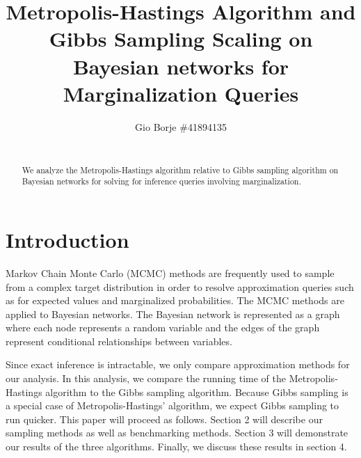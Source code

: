 \documentclass{sig-alternate}
\begin{document}
\title{Metropolis-Hastings Algorithm and Gibbs Sampling Scaling on
Bayesian networks for Marginalization Queries}
\author{
	Gio Borje \#41894135\\
	 \\
	}
\maketitle

\begin{abstract}
We analyze the Metropolis-Hastings algorithm relative to Gibbs sampling
algorithm on Bayesian networks for solving for inference queries involving
marginalization.
\end{abstract}

\section{Introduction} %
\label{sec:Introduction}
	Markov Chain Monte Carlo (MCMC) methods are frequently used to sample
	from a complex target distribution in order to resolve approximation
	queries such as for expected values and marginalized probabilities.
	The MCMC methods are applied to Bayesian networks. The Bayesian
	network is represented as a graph where each node represents a random
	variable and the edges of the graph represent conditional
	relationships between variables. \cite{rn2010}

	Since exact inference is intractable, we only compare approximation
	methods for our analysis. In this analysis, we compare the running
	time of the Metropolis-Hastings algorithm to the Gibbs sampling
	algorithm. Because Gibbs sampling is a special case of
	Metropolis-Hastings' algorithm, we expect Gibbs sampling to run
	quicker. This paper will proceed as follows. Section 2 will describe
	our sampling methods as well as benchmarking methods. Section 3 will
	demonstrate our results of the three algorithms. Finally, we discuss
	these results in section 4.
\end{document}
